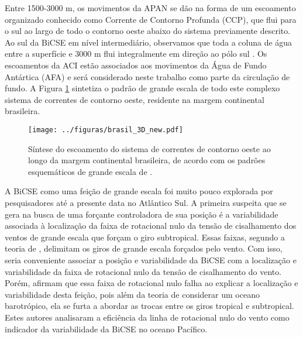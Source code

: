 Entre 1500-3000 m, os movimentos da APAN se dão na forma de um escoamento organizado conhecido 
como Corrente de Contorno Profunda (CCP), que flui para o sul ao largo de todo o contorno
oeste abaixo do sistema previamente descrito. Ao sul da BiCSE em nível intermediário, 
observamos que toda a coluna de água entre a superfície e 3000 m flui integralmente 
em direção ao pólo sul \citep{zemba1991,silveira_etal2000A}. Os escoamentos da ACI estão 
associados aos movimentos da Água de Fundo Antártica (AFA) e será considerado neste trabalho
como parte da circulação de fundo. A Figura \ref{fig:brasil_3D}
sintetiza o padrão de grande escala de todo este complexo sistema de correntes de 
contorno oeste, residente na margem continental brasileira.

\begin{figure}%
 \begin{center}
  \texttt{[image: ../figuras/brasil\_3D\_new.pdf]}
 \end{center}
 \vspace{-.5cm}
 \renewcommand{\baselinestretch}{1}
 \caption{\label{fig:brasil_3D} \small Síntese do escoamento do sistema de correntes 
de contorno oeste ao longo da margem continental brasileira, de acordo com os padrões esquemáticos de grande escala de \cite{stramma_england1999}.}
\end{figure}

A BiCSE como uma feição de grande escala foi muito pouco explorada por pesquisadores até a presente data no Atlântico Sul. A primeira 
suspeita que se gera na busca de uma forçante controladora de sua posição é a variabilidade associada à localização da faixa de 
rotacional nulo da tensão de cisalhamento dos ventos de grande escala que forçam o giro subtropical. Essas faixas, segundo a teoria de \cite{sverdrup1947},
delimitam os giros de grande escala forçados pelo vento. Com isso, seria conveniente associar a posição e 
variabilidade da BiCSE com a localização e variabilidade da faixa de rotacional nulo da tensão de cisalhamento do vento. 
Porém, \cite{qu_lukas2003} afirmam que essa faixa de rotacional nulo falha ao explicar a localização e variabilidade 
desta feição, pois além da teoria de \cite{sverdrup1947} considerar um oceano barotrópico, ela se furta a abordar as trocas entre os giros tropical e subtropical. Estes autores analisaram a eficiência da linha de rotacional nulo do vento como
indicador da variabilidade da BiCSE no oceano Pacífico. 

